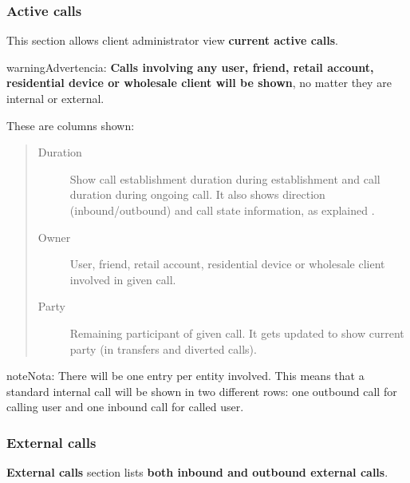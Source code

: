 \documentclass[letterpaper,10pt,spanish]{sphinxmanual}
\begin{document}
\subsubsection{Active calls}
\label{administration_portal/client/retail/calls/active_calls::doc}\label{administration_portal/client/retail/calls/active_calls:active-calls}
This section allows client administrator view \textbf{current active calls}.

\begin{notice}{warning}{Advertencia:}
\textbf{Calls involving any user, friend, retail account, residential device or wholesale client will be shown},
no matter they are internal or external.
\end{notice}

These are columns shown:
\begin{quote}
\begin{description}
\item[{Duration}] \leavevmode
Show call establishment duration during establishment and call duration during ongoing call. It also shows
direction (inbound/outbound) and call state information, as explained {\hyperref[administration_portal/platform/active_calls:call\string-state]{}}.

\item[{Owner}] \leavevmode
User, friend, retail account, residential device or wholesale client involved in given call.

\item[{Party}] \leavevmode
Remaining participant of given call. It gets updated to show current party (in transfers and diverted calls).

\end{description}
\end{quote}

\begin{notice}{note}{Nota:}
There will be one entry per entity involved. This means that a standard internal call will be shown
in two different rows: one outbound call for calling user and one inbound call for called user.
\end{notice}


\subsubsection{External calls}
\label{administration_portal/client/retail/calls/external_calls::doc}\label{administration_portal/client/retail/calls/external_calls:external-calls}
\textbf{External calls} section lists \textbf{both inbound and outbound external calls}.
\end{document}

